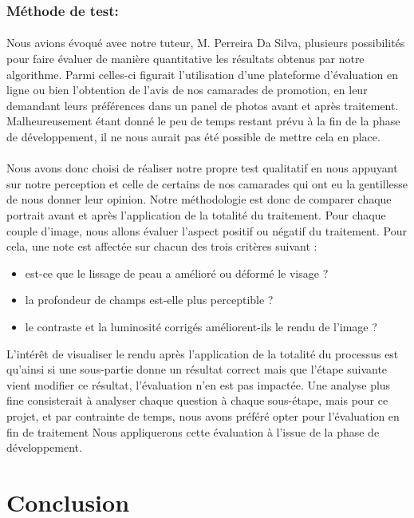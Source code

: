 \documentclass[11pt, french,screen]{report-rd-info}
\begin{document}
\subsubsection{Méthode de test:}
\paragraph*{}
Nous avions évoqué avec notre tuteur, M. Perreira Da Silva, plusieurs possibilités pour faire évaluer de manière quantitative les résultats obtenus par notre algorithme.
Parmi celles-ci figurait l'utilisation d'une plateforme d'évaluation en ligne ou bien l'obtention de l'avis de nos camarades de promotion, en leur demandant leurs préférences dans un panel de photos avant et après traitement.
Malheureusement étant donné le peu de temps restant prévu à la fin de la phase de développement, il ne nous aurait pas été possible de mettre cela en place.
\paragraph*{}
Nous avons donc choisi de réaliser notre propre test qualitatif en nous appuyant sur notre perception et celle de certains de nos camarades qui ont eu la gentillesse de nous donner leur opinion.
Notre méthodologie est donc de comparer chaque portrait avant et après l'application de la totalité du traitement. Pour chaque couple d'image, nous allons évaluer l'aspect positif ou négatif du traitement. Pour cela, une note est affectée sur chacun des trois critères suivant :
\begin{itemize}
\item est-ce que le lissage de peau a amélioré ou déformé le visage ?
\item la profondeur de champs est-elle plus perceptible ?
\item le contraste et la luminosité corrigés améliorent-ils le rendu de l'image ?
\end{itemize}

L'intérêt de visualiser le rendu après l'application de la totalité du processus est qu'ainsi si une sous-partie donne un résultat correct mais que l'étape suivante vient modifier ce résultat, l’évaluation n’en est pas impactée. Une analyse plus fine consisterait à analyser chaque question à chaque sous-étape, mais pour ce projet, et par contrainte de temps, nous avons préféré opter pour l’évaluation en fin de traitement
Nous appliquerons cette évaluation à l’issue de la phase de développement.


\section{Conclusion}
\end{document}
